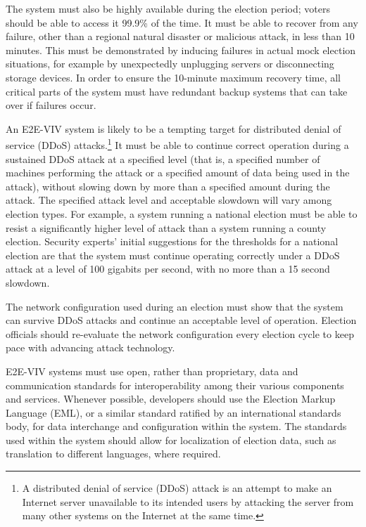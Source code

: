 The system must also be highly available during the election period;
voters should be able to access it 99.9\% of the time. It must be able
to recover from any failure, other than a regional natural disaster or
malicious attack, in less than 10 minutes. This must be demonstrated
by inducing failures in actual mock election situations, for example
by unexpectedly unplugging servers or disconnecting storage
devices. In order to ensure the 10-minute maximum recovery time, all
critical parts of the system must have redundant backup systems that
can take over if failures occur.

An E2E-VIV system is likely to be a tempting target for distributed
denial of service (DDoS) attacks.\footnote{A distributed denial of
  service (DDoS) attack is an attempt to make an Internet server
  unavailable to its intended users by attacking the server from many
  other systems on the Internet at the same time.} It must be able to
continue correct operation during a sustained DDoS attack at a
specified level (that is, a specified number of machines performing
the attack or a specified amount of data being used in the attack),
without slowing down by more than a specified amount during the
attack.  The specified attack level and acceptable slowdown will vary
among election types. For example, a system running a national
election must be able to resist a significantly higher level of attack
than a system running a county election. Security experts' initial
suggestions for the thresholds for a national election are that the
system must continue operating correctly under a DDoS attack at a
level of 100 gigabits per second, with no more than a 15 second
slowdown.

The network configuration used during an election must show that the
system can survive DDoS attacks and continue an acceptable level of
operation. Election officials should re-evaluate the network
configuration every election cycle to keep pace with advancing attack
technology.

\label{sec:interoperability}

E2E-VIV systems must use open, rather than proprietary, data and
communication standards for interoperability among their various
components and services. Whenever possible, developers should use the
Election Markup Language (EML), or a similar standard ratified by an
international standards body, for data interchange and configuration
within the system. The standards used within the system should allow
for localization of election data, such as translation to different
languages, where required.

